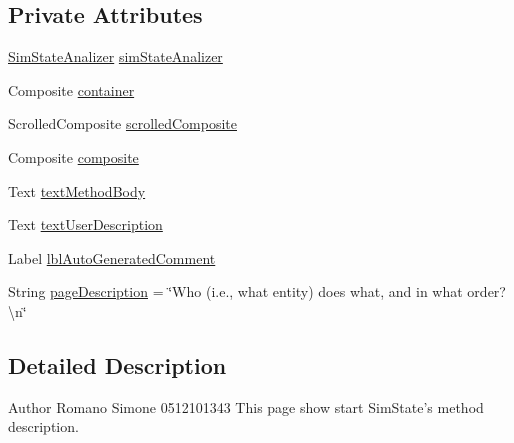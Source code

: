 \subsection*{Private Attributes}
\begin{DoxyCompactItemize}
\item 
\hyperlink{classit_1_1isislab_1_1masonassisteddocumentation_1_1mason_1_1analizer_1_1_sim_state_analizer}{Sim\-State\-Analizer} \hyperlink{classit_1_1isislab_1_1masonassisteddocumentation_1_1mason_1_1wizards_1_1_i___start_information_page_ac785beb38d77fb4d31f63bfc00054bbc}{sim\-State\-Analizer}
\item 
Composite \hyperlink{classit_1_1isislab_1_1masonassisteddocumentation_1_1mason_1_1wizards_1_1_i___start_information_page_ad86fe5776c8b93794dcdf3bfa7099c37}{container}
\item 
Scrolled\-Composite \hyperlink{classit_1_1isislab_1_1masonassisteddocumentation_1_1mason_1_1wizards_1_1_i___start_information_page_a8ceeef097246f40de9ca88f3276661d8}{scrolled\-Composite}
\item 
Composite \hyperlink{classit_1_1isislab_1_1masonassisteddocumentation_1_1mason_1_1wizards_1_1_i___start_information_page_a0b4e57697b3d0beb37e32157277604c9}{composite}
\item 
Text \hyperlink{classit_1_1isislab_1_1masonassisteddocumentation_1_1mason_1_1wizards_1_1_i___start_information_page_a858c21e714eee1277872dc8e8d190094}{text\-Method\-Body}
\item 
Text \hyperlink{classit_1_1isislab_1_1masonassisteddocumentation_1_1mason_1_1wizards_1_1_i___start_information_page_ae9194cb7a9d204939dbea568a7b4d0e2}{text\-User\-Description}
\item 
Label \hyperlink{classit_1_1isislab_1_1masonassisteddocumentation_1_1mason_1_1wizards_1_1_i___start_information_page_aca7f53a1faffbca69e3509af27117c2f}{lbl\-Auto\-Generated\-Comment}
\item 
String \hyperlink{classit_1_1isislab_1_1masonassisteddocumentation_1_1mason_1_1wizards_1_1_i___start_information_page_a934ead7814664a3f6792b9518593460c}{page\-Description} = \char`\"{}Who (i.\-e., what entity) does what, and in what order?\textbackslash{}n\char`\"{}
\end{DoxyCompactItemize}


\subsection{Detailed Description}
\begin{DoxyAuthor}{Author}
Romano Simone 0512101343 This page show start Sim\-State's method description. 
\end{DoxyAuthor}


